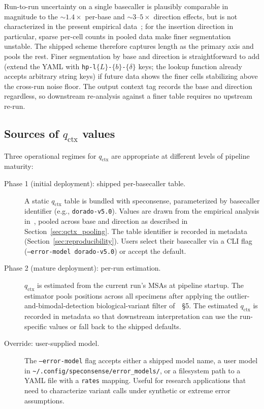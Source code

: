 \documentclass[11pt]{article}
\begin{document}
Run-to-run uncertainty on a single basecaller is plausibly comparable in
magnitude to the $\sim\!1.4\times$ per-base and $\sim\!3\text{--}5\times$
direction effects, but is not characterized in the present empirical
data~\cite{hp_paper}; for the insertion direction in particular, sparse
per-cell counts in pooled data make finer segmentation unstable. The
shipped scheme therefore captures length as the primary axis and pools the
rest. Finer segmentation by base and direction is straightforward to add
(extend the YAML with \texttt{hp-l$\{L\}$-$\{b\}$-$\{\delta\}$} keys; the
lookup function already accepts arbitrary string keys) if future data shows
the finer cells stabilizing above the cross-run noise floor. The output context
tag records the base and direction regardless, so downstream re-analysis
against a finer table requires no upstream re-run.

\subsection{Sources of $q_\text{ctx}$ values}

Three operational regimes for $q_\text{ctx}$ are appropriate at different
levels of pipeline maturity:

\begin{description}
\item[Phase 1 (initial deployment): shipped per-basecaller table.] A static
$q_\text{ctx}$ table is bundled with speconsense, parameterized by basecaller
identifier (e.g., \texttt{dorado-v5.0}). Values are drawn from the empirical
analysis in~\cite{hp_paper}, pooled across base and direction as described in
Section~\ref{sec:qctx_pooling}. The table identifier is recorded in metadata
(Section~\ref{sec:reproducibility}). Users select their basecaller via a CLI
flag (\texttt{--error-model dorado-v5.0}) or accept the default.

\item[Phase 2 (mature deployment): per-run estimation.] $q_\text{ctx}$ is
estimated from the current run's MSAs at pipeline startup. The estimator
pools positions across all specimens after applying the
outlier-and-bimodal-detection biological-variant filter
of~\cite{hp_paper}~\S 5. The estimated $q_\text{ctx}$ is recorded in
metadata so that downstream interpretation can use the run-specific values
or fall back to the shipped defaults.

\item[Override: user-supplied model.] The \texttt{--error-model} flag accepts
either a shipped model name, a user model in
\texttt{\textasciitilde/.config/speconsense/error\_models/}, or a filesystem
path to a YAML file with a \texttt{rates} mapping. Useful for research
applications that need to characterize variant calls under synthetic or
extreme error assumptions.
\end{description}
\end{document}
